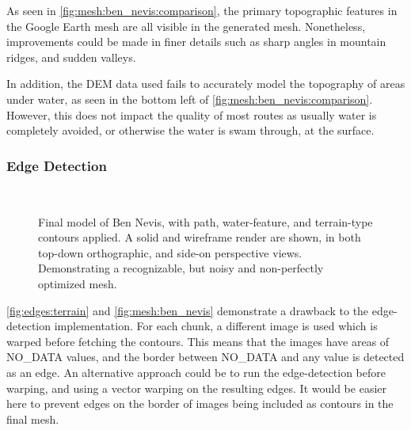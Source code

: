 \documentclass[12pt]{article}
\begin{document}
As seen in \autoref{fig:mesh:ben_nevis:comparison}, the primary topographic features in the Google Earth mesh are all visible in the generated mesh. Nonetheless, improvements could be made in finer details such as sharp angles in mountain ridges, and sudden valleys.

In addition, the DEM data used fails to accurately model the topography of areas under water, as seen in the bottom left of \autoref{fig:mesh:ben_nevis:comparison}. However, this does not impact the quality of most routes as usually water is completely avoided, or otherwise the water is swam through, at the surface.

\subsubsection{Edge Detection}

\begin{figure}[!htbp]
  \centering
  \\
  \caption{Final model of Ben Nevis, with path, water-feature, and terrain-type contours applied. A solid and wireframe render are shown, in both top-down orthographic, and side-on perspective views. Demonstrating a recognizable, but noisy and non-perfectly optimized mesh.}\label{fig:mesh:ben_nevis}
\end{figure}

\autoref{fig:edges:terrain} and \autoref{fig:mesh:ben_nevis} demonstrate a drawback to the edge-detection implementation. For each chunk, a different image is used which is warped before fetching the contours. This means that the images have areas of NO\_DATA values, and the border between NO\_DATA and any value is detected as an edge. An alternative approach could be to run the edge-detection before warping, and using a vector warping on the resulting edges. It would be easier here to prevent edges on the border of images being included as contours in the final mesh.
\end{document}
